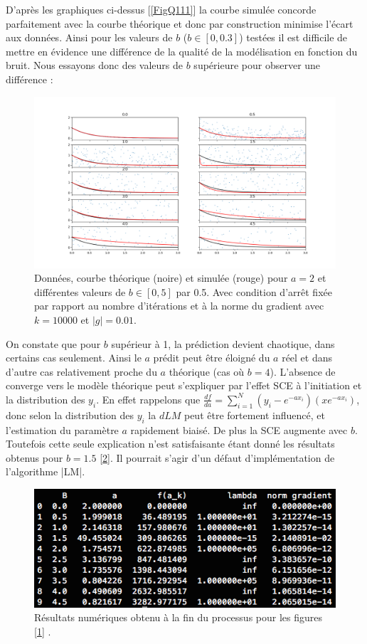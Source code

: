\documentclass[12pt]{article}
\begin{document}
 D'après les graphiques ci-dessus [\ref{FigQ111}] la courbe simulée concorde parfaitement avec la courbe théorique et donc par construction minimise l'écart aux données. Ainsi pour les valeurs de $b$ ($b \in [0, 0.3]$) testées il est difficile de mettre en évidence une différence de la qualité de la modélisation en fonction du bruit. Nous essayons donc des valeurs de $b$ supérieure pour observer une différence : 
 
 \begin{figure}[H]
\centering
\includegraphics[width=1\textwidth]{Q1132.png}
\caption{Données, courbe théorique (noire) et simulée (rouge) pour $a=2$ et différentes valeurs de $b  \in [0,5]$ par 0.5. Avec condition d'arrêt fixée par rapport au nombre d'itérations et à la norme du gradient avec $k = 10000$ et $|g|=0.01$.}
\label{FigQ1132}


\end{figure}

On constate que pour $b$ supérieur à 1, la prédiction devient chaotique,  dans certains cas seulement. Ainsi le $a$ prédit peut être éloigné du $a$ réel et dans d'autre cas relativement proche du $a$ théorique (cas où $b = 4$). L'absence de converge vers le modèle théorique peut s'expliquer par  l'effet SCE à l'initiation et la distribution des $y_i$. En effet rappelons que $\frac{d f}{d a} = \sum_{i=1}^N (y_i - e^{-ax_i})(x e^{-ax_i})$, donc selon la distribution des $y_i$ la $dLM$ peut être fortement influencé, et l'estimation du paramètre $a$ rapidement biaisé. De plus la SCE augmente avec $b$. Toutefois cette seule explication n'est satisfaisante étant donné les résultats obtenus pour $b=1.5$ [\ref{FigQcap}]. Il pourrait s'agir d'un défaut d'implémentation de l'algorithme \vreb|LM|.


  \begin{figure}[H]
\centering
\includegraphics[width=1\textwidth]{Q113CAP.png}
\caption{Résultats numériques obtenu à la fin du processus pour les figures [\ref{FigQ1132}] .}
\label{FigQcap}
\end{figure}
 
\end{document}
